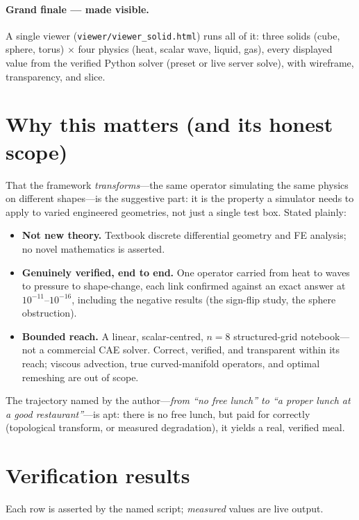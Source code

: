 \documentclass[11pt]{article}
\newcommand{\code}[1]{\texttt{#1}}
\begin{document}
\paragraph{Grand finale --- made visible.}
A single viewer (\code{viewer/viewer\_solid.html}) runs all of it: three solids
(cube, sphere, torus) $\times$ four physics (heat, scalar wave, liquid, gas), every
displayed value from the verified Python solver (preset or live server solve), with
wireframe, transparency, and slice.

\section{Why this matters (and its honest scope)}
That the framework \emph{transforms}---the same operator simulating the same
physics on different shapes---is the suggestive part: it is the property a
simulator needs to apply to varied engineered geometries, not just a single test
box. Stated plainly:
\begin{itemize}[leftmargin=1.4em]
  \item \textbf{Not new theory.} Textbook discrete differential geometry and FE
  analysis; no novel mathematics is asserted.
  \item \textbf{Genuinely verified, end to end.} One operator carried from heat to
  waves to pressure to shape-change, each link confirmed against an exact answer at
  $10^{-11}$--$10^{-16}$, including the negative results (the sign-flip study, the
  sphere obstruction).
  \item \textbf{Bounded reach.} A linear, scalar-centred, $n{=}8$ structured-grid
  notebook---not a commercial CAE solver. Correct, verified, and transparent within
  its reach; viscous advection, true curved-manifold operators, and optimal
  remeshing are out of scope.
\end{itemize}
The trajectory named by the author---\emph{from ``no free lunch'' to ``a proper
lunch at a good restaurant''}---is apt: there is no free lunch, but paid for
correctly (topological transform, or measured degradation), it yields a real,
verified meal.

\appendix
\section{Verification results}
Each row is asserted by the named script; \emph{measured} values are live output.
\end{document}
